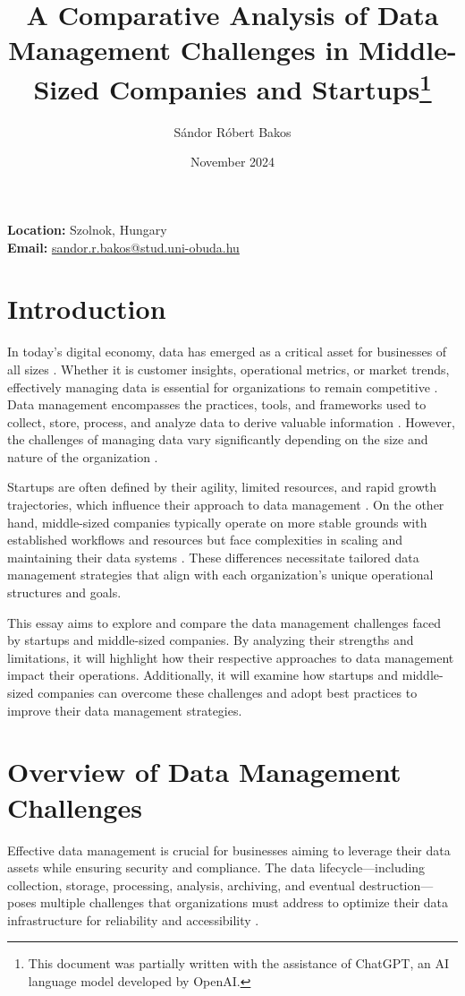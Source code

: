 \documentclass{article}
\title{A Comparative Analysis of Data Management Challenges in Middle-Sized Companies and Startups\thanks{This document was partially written with the assistance of ChatGPT, an AI language model developed by OpenAI.\cite{openai2024chatgpt}}}
\author{Sándor Róbert Bakos}
\date{November 2024}
\makeatletter
\newcommand{\contactinfo}{
    \bigskip
    \noindent \textbf{Location:} Szolnok, Hungary \\
    \textbf{Email:} \href{mailto:sandor.r.bakos@stud.uni-obuda.hu}{sandor.r.bakos@stud.uni-obuda.hu}
}
\makeatother
\begin{document}
\maketitle
\contactinfo

\section*{Introduction} 

In today’s digital economy, data has emerged as a critical asset for businesses of all sizes \cite{mcafee2012bigdata}. Whether it is customer insights, operational metrics, or market trends, effectively managing data is essential for organizations to remain competitive \cite{redman2013credibility}. Data management encompasses the practices, tools, and frameworks used to collect, store, process, and analyze data to derive valuable information \cite{dama2017dmbook}. However, the challenges of managing data vary significantly depending on the size and nature of the organization \cite{davenport2014bigdata}.

Startups are often defined by their agility, limited resources, and rapid growth trajectories, which influence their approach to data management \cite{ries2011leanstartup}. On the other hand, middle-sized companies typically operate on more stable grounds with established workflows and resources but face complexities in scaling and maintaining their data systems \cite{european2015smedef}. These differences necessitate tailored data management strategies that align with each organization's unique operational structures and goals.

This essay aims to explore and compare the data management challenges faced by startups and middle-sized companies. By analyzing their strengths and limitations, it will highlight how their respective approaches to data management impact their operations. Additionally, it will examine how startups and middle-sized companies can overcome these challenges and adopt best practices to improve their data management strategies.

\section*{Overview of Data Management Challenges}

Effective data management is crucial for businesses aiming to leverage their data assets while ensuring security and compliance. The data lifecycle—including collection, storage, processing, analysis, archiving, and eventual destruction—poses multiple challenges that organizations must address to optimize their data infrastructure for reliability and accessibility \cite{dama2017}.
\end{document}
